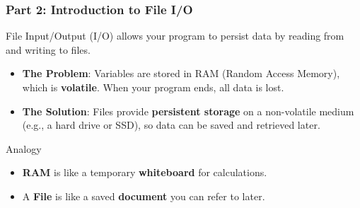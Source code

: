 \documentclass{beamer}
\begin{document}
\begin{frame}[fragile]
    \frametitle{Part 2: Introduction to File I/O}
    \subtitle{Why Use Files? Data Persistence}
    
    File Input/Output (I/O) allows your program to persist data by reading from and writing to files.
    
    \vspace{1em}
    
    \begin{itemize}
        \item \textbf{The Problem}: Variables are stored in RAM (Random Access Memory), which is \textbf{volatile}. When your program ends, all data is lost.
        
        \item \textbf{The Solution}: Files provide \textbf{persistent storage} on a non-volatile medium (e.g., a hard drive or SSD), so data can be saved and retrieved later.
    \end{itemize}
    
    \vspace{1em}
    
    \begin{block}{Analogy}
        \begin{itemize}
            \item \textbf{RAM} is like a temporary \textbf{whiteboard} for calculations.
            \item A \textbf{File} is like a saved \textbf{document} you can refer to later.
        \end{itemize}
    \end{block}
    
\end{frame}
\end{document}

